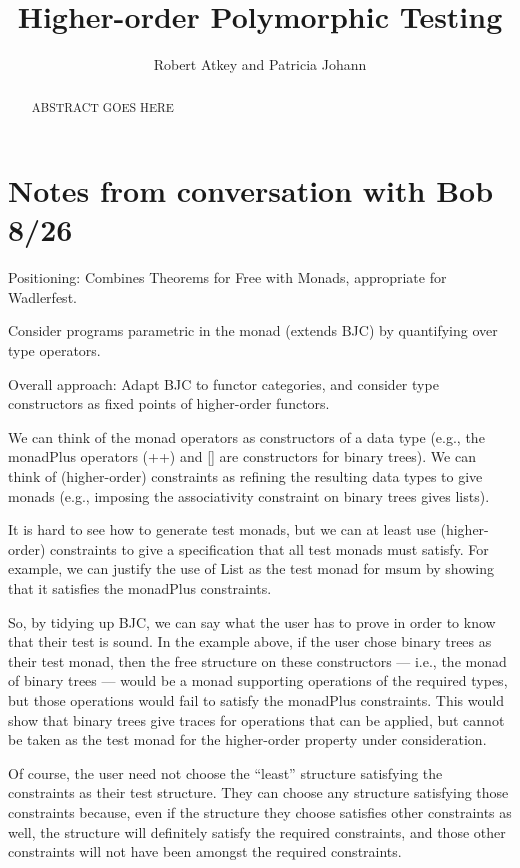 \documentclass{article}[12 pt]
\title{Higher-order Polymorphic Testing}
\author{Robert Atkey and Patricia Johann}
\theoremstyle{problemstyle}
\begin{document}
\maketitle

\begin{abstract}
ABSTRACT GOES HERE
\end{abstract}

\section{Notes from conversation with Bob 8/26}

Positioning: Combines Theorems for Free with Monads, appropriate for
Wadlerfest.

Consider programs parametric in the monad (extends BJC) by quantifying
over type operators. 

Overall approach: Adapt BJC to functor categories, and consider type
constructors as fixed points of higher-order functors.

We can think of the monad operators as constructors of a data type
(e.g., the monadPlus operators (++) and [] are constructors for binary
trees). We can think of (higher-order) constraints as refining the
resulting data types to give monads (e.g., imposing the associativity
constraint on binary trees gives lists).

It is hard to see how to generate test monads, but we can at least use
(higher-order) constraints to give a specification that all test monads must
satisfy. For example, we can justify the use of List as the test monad
for msum by showing that it satisfies the monadPlus constraints. 

So, by tidying up BJC, we can say what the user has to prove in order
to know that their test is sound. In the example above, if the user
chose binary trees as their test monad, then the free structure on
these constructors --- i.e., the monad of binary trees --- would be a
monad supporting operations of the required types, but those
operations would fail to satisfy the monadPlus constraints. This would
show that binary trees give traces for operations that can be applied,
but cannot be taken as the test monad for the higher-order property
under consideration.

Of course, the user need not choose the ``least'' structure satisfying
the constraints as their test structure. They can choose any structure
satisfying those constraints because, even if the structure they
choose satisfies other constraints as well, the structure will
definitely satisfy the required constraints, and those other
constraints will not have been amongst the required constraints.
\end{document}
